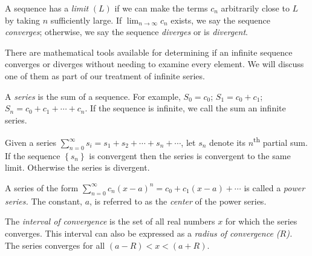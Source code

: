 \begin{definition}
A sequence has a \emph{limit} $(L)$ if we can make the terms $c_n$ arbitrarily close to $L$ by taking $n$ sufficiently large.  If $\lim_{n\to \infty} c_n$ exists, we say the sequence \emph{converges}; otherwise, we say the sequence \emph{diverges} or is \emph{divergent}.
\end{definition}

There are mathematical tools available for determining if an infinite sequence converges or diverges without needing to examine every element.  We will discuss one of them as part of our treatment of infinite series.

\begin{definition}
A \emph{series} is the sum of a sequence. For example, $S_0 = c_0$; $S_1 = c_0+c_1$; $S_n = c_0+c_1+\cdots+c_n$.  If the sequence is infinite, we call the sum an infinite series.
\end{definition}

\begin{definition}
Given a series $\sum_{n=0}^{\infty}s_i=s_1+s_2+\cdots+s_n+\cdots$, let $s_n$ denote its $n$\textsuperscript{th} partial sum.  If the sequence $\left\{s_n \right\}$ is convergent then the series is convergent to the same limit.  Otherwise the series is divergent.
\end{definition}

 
\begin{definition}
A series of the form $\sum_{n=0}^{\infty}c_n(x-a)^n=c_0+c_1(x-a)+\cdots$ is called a \emph{power series.} The constant, $a$, is referred to as the \emph{center} of the power series.
\end{definition}


\begin{definition}
The \emph{interval of convergence} is the set of all real numbers $x$ for which the series converges.  This interval can also be expressed as a \emph{radius of convergence ($R$).}  The series converges for all $(a-R) < x < (a+R)$.
\end{definition}

